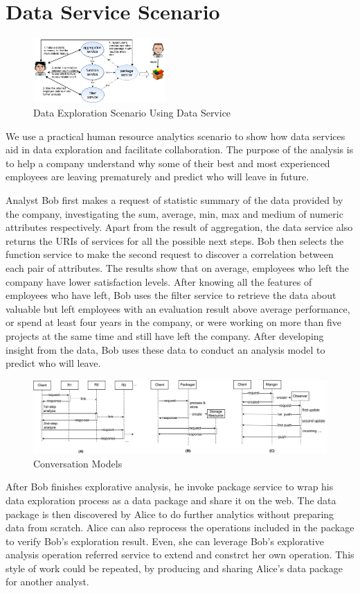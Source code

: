 \documentclass[10pt, conference, compsocconf]{IEEEtran}
\begin{document}
\section{Data Service Scenario}
\begin{figure}[th]
	\centering
	\includegraphics[width=0.45\textwidth]{scenario.png}
	\caption{Data Exploration Scenario Using Data Service}
	\label{fig.1}
\end{figure}
We use a practical human resource analytics scenario to show how data services aid in data exploration and facilitate collaboration. The purpose of the analysis is to help a company understand why some of their best and most experienced employees are leaving prematurely and predict who will leave in future. 

Analyst Bob first makes a request of statistic summary of the data provided by the company, investigating the sum, average, min, max and medium of numeric attributes respectively. Apart from the result of aggregation, the data service also returns the URIs of services for all the possible next steps. Bob then selects the function service to make the second request to discover a correlation between each pair of attributes. The results show that on average, employees who left the company have lower satisfaction levels. After knowing all the features of employees who have left, Bob uses the filter service to retrieve the data about valuable but left employees with an evaluation result above average performance, or spend at least four years in the company, or were working on more than five projects at the same time and still have left the company. After developing insight from the data, Bob uses these data to conduct an analysis model to predict who will leave.
\begin{figure}
	\centering
	\includegraphics[width=1.0\textwidth]{ThreeConversationModels}
	\caption{Conversation Models}
	\label{fig.2}
\end{figure}
After Bob finishes explorative analysis, he invoke package service to wrap his data exploration process as a data package and share it on the web. The data package is then discovered by Alice to do further analytics without preparing data from scratch. Alice can also reprocess the operations included in the package to verify Bob’s exploration result. Even, she can leverage Bob's explorative analysis operation referred service to extend and constrct her own operation. This style of work could be repeated, by producing and sharing Alice's data package for another analyst.
\end{document}
